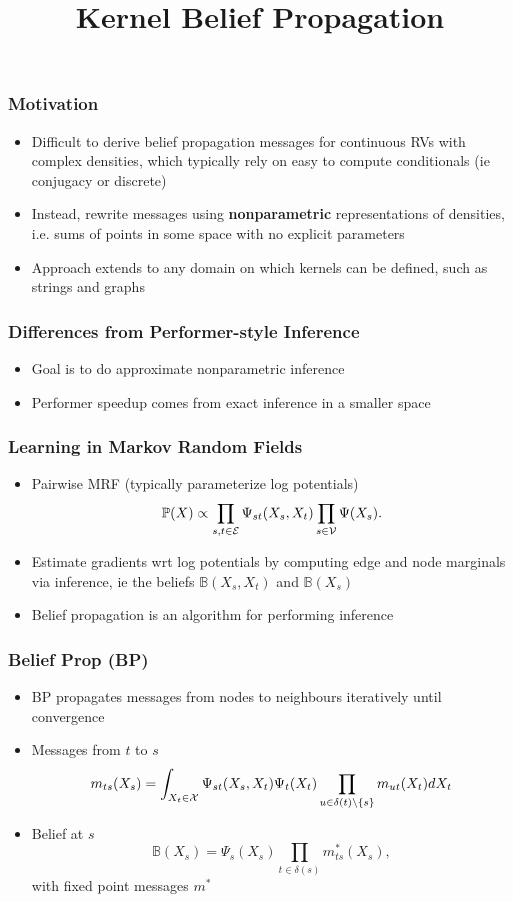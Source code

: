 \documentclass{beamer}
\title{Kernel Belief Propagation}
\begin{document}
 
\frame{\titlepage}
 
\begin{frame}
\frametitle{Motivation}
\begin{itemize}
\item Difficult to derive belief propagation messages for continuous RVs
    with complex densities, which typically rely on easy to compute conditionals
    (ie conjugacy or discrete)
\vspace{1em}
\item Instead, rewrite messages using \textbf{nonparametric} representations
of densities, i.e. sums of points in some space with no explicit parameters
\vspace{1em}
\item Approach extends to any domain on which kernels can be defined,
such as strings and graphs
\end{itemize}
\end{frame}

\begin{frame}
\frametitle{Differences from Performer-style Inference}
\begin{itemize}
\item Goal is to do approximate nonparametric inference
\item Performer speedup comes from exact inference in a smaller space
\end{itemize}
\end{frame}

\begin{frame}
\frametitle{Learning in Markov Random Fields}
\begin{itemize}
\item Pairwise MRF (typically parameterize log potentials)
$$\mathbb{P}(X) \propto \prod_{s,t \in \mathcal{E}} \Psi_{st}(X_s, X_t) \prod_{s\in\mathcal{V}} \Psi(X_s).$$
\item Estimate gradients wrt log potentials by computing edge and node marginals
via inference, ie the beliefs $\mathbb{B}(X_s, X_t)$ and $\mathbb{B}(X_s)$
\vspace{2em}
\item Belief propagation is an algorithm for performing inference
\end{itemize}
\end{frame}

\begin{frame}
\frametitle{Belief Prop (BP)}
\begin{itemize}
\item BP propagates messages from nodes to neighbours iteratively until convergence
\item Messages from $t$ to $s$
$$m_{ts}(X_s) = \int_{X_t\in\mathcal{X}} \Psi_{st}(X_s, X_t) \Psi_t(X_t)
    \prod_{u\in\delta(t)\setminus\left\{s\right\}} m_{ut}(X_t)dX_t$$
\item Belief at $s$
$$\mathbb{B}(X_s) = \Psi_s(X_s)\prod_{t\in\delta(s)} m_{ts}^*(X_s),$$
with fixed point messages $m^*$
\end{itemize}
\end{frame}
\end{document}

